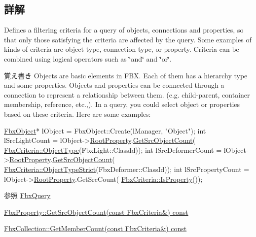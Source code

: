 \subsection{詳解}
Defines a filtering criteria for a query of objects, connections and properties, so that only those satisfying the criteria are affected by the query. Some examples of kinds of criteria are object type, connection type, or property. Criteria can be combined using logical operators such as \char`\"{}and\char`\"{} and \char`\"{}or\char`\"{}. \begin{DoxyNote}{覚え書き}
Objects are basic elements in F\+BX. Each of them has a hierarchy type and some properties. Objects and properties can be connected through a connection to represent a relationship between them. (e.\+g. child-\/parent, container membership, reference, etc.,). In a query, you could select object or properties based on these criteria. Here are some examples\+: 
\begin{DoxyCode}
\hyperlink{class_fbx_object}{FbxObject}* lObject = FbxObject::Create(lManager, \textcolor{stringliteral}{"Object"});
\textcolor{keywordtype}{int} lSrcLightCount = lObject->\hyperlink{class_fbx_object_a865ee4dfaa7a8f9050105d4477288da8}{RootProperty}.\hyperlink{class_fbx_property_a4b6d431d87134722800f06e4cb442335}{GetSrcObjectCount}(
      \hyperlink{class_fbx_criteria_a760d66022a8febcd3fd0c5fbbb534023}{FbxCriteria::ObjectType}(FbxLight::ClassId));
\textcolor{keywordtype}{int} lSrcDeformerCount = lObject->\hyperlink{class_fbx_object_a865ee4dfaa7a8f9050105d4477288da8}{RootProperty}.\hyperlink{class_fbx_property_a4b6d431d87134722800f06e4cb442335}{GetSrcObjectCount}(
      \hyperlink{class_fbx_criteria_a38bc13d95aaea852252625ca084054dd}{FbxCriteria::ObjectTypeStrict}(FbxDeformer::ClassId));
\textcolor{keywordtype}{int} lSrcPropertyCount = lObject->\hyperlink{class_fbx_object_a865ee4dfaa7a8f9050105d4477288da8}{RootProperty}.GetSrcCount(
      \hyperlink{class_fbx_criteria_abe944a4f8d41017f7043b4855f03d20e}{FbxCriteria::IsProperty}());
\end{DoxyCode}
 
\end{DoxyNote}
\begin{DoxySeeAlso}{参照}
\hyperlink{class_fbx_query}{Fbx\+Query} 

\hyperlink{class_fbx_property_ad90aa5b8d3fbe78a9bf541dcbcf9c210}{Fbx\+Property\+::\+Get\+Src\+Object\+Count(const Fbx\+Criteria\&) const} 

\hyperlink{class_fbx_collection_ab885c6a1cc7eb77b471ae11c65658258}{Fbx\+Collection\+::\+Get\+Member\+Count(const Fbx\+Criteria\&) const} 
\end{DoxySeeAlso}


